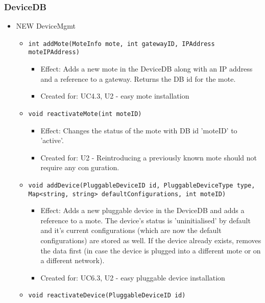 {{{    \subsubsection{DeviceDB}
        \begin{itemize}
            \item NEW DeviceMgmt
                \begin{itemize}
                    \item \texttt{int addMote(MoteInfo mote, int gatewayID, IPAddress moteIPAddress)}
                        \begin{itemize}
                            \item Effect: Adds a new mote in the DeviceDB along with an IP address and a reference to a gateway. Returns the DB id for the mote.
                            \item Created for: UC4.3, U2 - easy mote installation
                        \end{itemize}
                    \item \texttt{void reactivateMote(int moteID)}
                        \begin{itemize}
                            \item Effect: Changes the status of the mote with DB id 'moteID' to 'active'.
                            \item Created for: U2 - Reintroducing a previously known mote should not require any conguration.
                        \end{itemize}
                    \item \texttt{void addDevice(PluggableDeviceID id, PluggableDeviceType type, Map<string, string> defaultConfigurations, int moteID)}
                        \begin{itemize}
                            \item Effect: Adds a new pluggable device in the DeviceDB and adds a reference to a mote. The device's status is 'uninitialised' by default and it's current configurations (which are now the default configurations) are stored as well. If the device already exists, removes the data first (in case the device is plugged into a different mote or on a different network).
                            \item Created for: UC6.3, U2 - easy pluggable device installation
                        \end{itemize}
                    \item \texttt{void reactivateDevice(PluggableDeviceID id)}

\end{itemize}
\end{itemize}}}}
